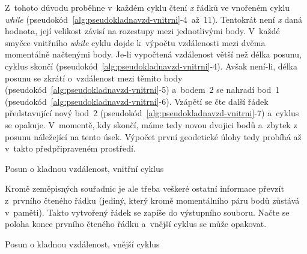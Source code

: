 Z~tohoto důvodu proběhne v~každém cyklu čtení \textit{x} řádků ve vnořeném cyklu \textit{while}
(pseudokód~\ref{alg:pseudokladnavzd-vnitrni}-4~až~11).
Tentokrát není \textit{x} daná hodnota, její velikost závisí na rozestupy mezi jednotlivými body.
V~každé smyčce vnitřního \textit{while} cyklu dojde k~výpočtu vzdálenosti mezi dvěma momentálně
načtenými body. Je-li vypočtená vzdálenost větší než délka posunu, cyklus skončí
(pseudokód~\ref{alg:pseudokladnavzd-vnitrni}-4). 
Avšak není-li, délka posunu se zkrátí o~vzdálenost mezi těmito body
(pseudokód~\ref{alg:pseudokladnavzd-vnitrni}-5) a~bodem~2 se nahradí bod~1
(pseudokód~\ref{alg:pseudokladnavzd-vnitrni}-6).
Vzápětí se čte další řádek představující nový bod~2
(pseudokód~\ref{alg:pseudokladnavzd-vnitrni}-7)
a~cyklus se opakuje. V~momentě, kdy
skončí, máme tedy novou dvojici bodů a~zbytek z posunu náležející na tento úsek.
Výpočet první geodetické úlohy tedy probíhá až v~takto předpřipraveném prostředí. 

\begin{algorithm}
\caption{Posun o kladnou vzdálenost, vnitřní cyklus}
\label{alg:pseudokladnavzd-vnitrni}
    \begin{algorithmic}[1]
    \ENDIF
    \ENDWHILE
    \end{algorithmic}
\end{algorithm}

Kromě zeměpisných souřadnic je ale třeba veškeré ostatní informace převzít z~prvního
čteného řádku (jediný, který kromě momentálního páru bodů zůstává v~paměti). Takto vytvořený
řádek se zapíše do výstupního souboru. Načte se poloha konce prvního čteného řádku
a~vnější cyklus se může opakovat. 

\begin{algorithm}
\caption{Posun o kladnou vzdálenost, vnější cyklus}
\label{alg:pseudokladnavzd-vnejsi}
    \begin{algorithmic}[1]
\end{algorithmic}
\end{algorithm}

